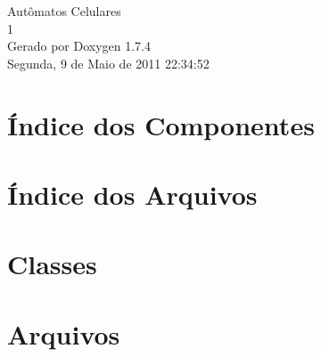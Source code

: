 \documentclass[a4paper]{book}
\begin{document}
\hypersetup{pageanchor=false}
\begin{titlepage}
\vspace*{7cm}
\begin{center}
{\Large Autômatos Celulares \\[1ex]\large 1 }\\
\vspace*{1cm}
{\large Gerado por Doxygen 1.7.4}\\
\vspace*{0.5cm}
{\small Segunda, 9 de Maio de 2011 22:34:52}\\
\end{center}
\end{titlepage}
\clearemptydoublepage
{}
\tableofcontents
\clearemptydoublepage
{}
\hypersetup{pageanchor=true}
\chapter{Índice dos Componentes}

\chapter{Índice dos Arquivos}

\chapter{Classes}







\chapter{Arquivos}
















\printindex
\end{document}

